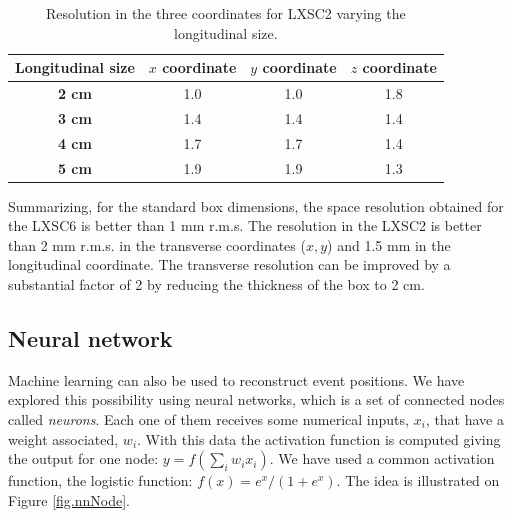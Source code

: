 %

\begin{table}[h]
\caption{\label{tab.position2Z} Resolution in the three coordinates for LXSC2 varying the longitudinal size.}
\begin{center}
 \begin{tabular}{c|ccc}
  \toprule
   {\bf Longitudinal size} & \textbf{$x$ coordinate} & \textbf{$y$ coordinate} & \textbf{$z$ coordinate}\\
   \hline
  {\bf 2 cm} & 1.0 & 1.0 & 1.8\\
  {\bf 3 cm} & 1.4 & 1.4 & 1.4\\
  {\bf 4 cm} & 1.7 & 1.7 & 1.4\\
  {\bf 5 cm} & 1.9 & 1.9 & 1.3\\
  \toprule
 \end{tabular}
\end{center}
\end{table}


Summarizing, for the standard box dimensions, the space resolution obtained for the LXSC6 is better than 1 mm r.m.s. The resolution in the LXSC2 is better than 2 mm r.m.s. in the transverse coordinates ($x,y$) and 1.5 mm in the longitudinal coordinate. The transverse resolution can be improved by a substantial factor of 2 by reducing the thickness of the box to 2 cm. 

\subsection{Neural network}
Machine learning can also be used to reconstruct event positions. We have explored this possibility using neural networks, which is a set of connected nodes called {\it neurons}. Each one of them receives some numerical inputs, $x_i$, that have a weight associated, $w_i$. With this data the activation function is computed giving the output for one node: $y = f(\sum_i w_i x_i )$. We have used a common activation function, the logistic function: $f(x) = e^x/(1+e^x)$. The idea is illustrated on Figure \ref{fig.nnNode}. 

